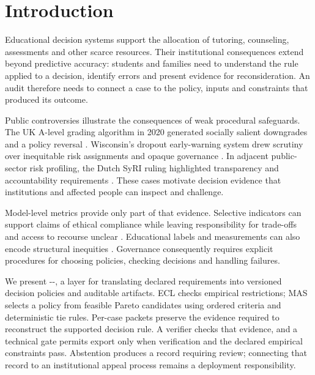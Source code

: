 \section{Introduction}
\label{sec:introduction}

Educational decision systems support the allocation of tutoring, counseling, assessments and other scarce resources. Their institutional consequences extend beyond predictive accuracy: students and families need to understand the rule applied to a decision, identify errors and present evidence for reconsideration. An audit therefore needs to connect a case to the policy, inputs and constraints that produced its outcome.

Public controversies illustrate the consequences of weak procedural safeguards. The UK A-level grading algorithm in 2020 generated socially salient downgrades and a policy reversal \cite{Wired2020AlevelAlgorithm}. Wisconsin's dropout early-warning system drew scrutiny over inequitable risk assignments and opaque governance \cite{Markup2023DEWS}. In adjacent public-sector risk profiling, the Dutch SyRI ruling highlighted transparency and accountability requirements \cite{SyRI2020Case}. These cases motivate decision evidence that institutions and affected people can inspect and challenge.

Model-level metrics provide only part of that evidence. Selective indicators can support claims of ethical compliance while leaving responsibility for trade-offs and access to recourse unclear \cite{CitronPasquale2014ScoredSociety,Wieringa2020AccountFor,Metcalf2021AIA,Selbst2019Abstraction}. Educational labels and measurements can also encode structural inequities \cite{BakerHawn2022AlgorithmicBiasEducation}. Governance consequently requires explicit procedures for choosing policies, checking decisions and handling failures.

We present \compa-\ecl-\mas, a layer for translating declared requirements into versioned decision policies and auditable artifacts. ECL checks empirical restrictions; MAS selects a policy from feasible Pareto candidates using ordered criteria and deterministic tie rules. Per-case packets preserve the evidence required to reconstruct the supported decision rule. A verifier checks that evidence, and a technical gate permits export only when verification and the declared empirical constraints pass. Abstention produces a record requiring review; connecting that record to an institutional appeal process remains a deployment responsibility.

